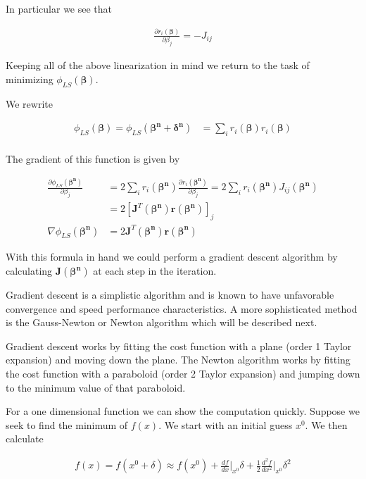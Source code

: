 \documentclass[12pt]{article}
\newcommand{\bv}[1]{\boldsymbol{#1}}
\begin{document}
In particular we see that

\begin{align}
\frac{\partial r_i(\bv{\beta})}{\partial \beta_j} = -J_{ij}
\end{align}

Keeping all of the above linearization in mind we return to the task of minimizing $\phi_{LS}(\bv{\beta})$.

We rewrite

\begin{align}
\phi_{LS}(\bv{\beta}) = \phi_{LS}(\bv{\beta^n + \delta^n}) &= \sum_i r_i(\bv{\beta})r_i(\bv{\beta})\\
\end{align}

The gradient of this function is given by

\begin{align}
\frac{\partial \phi_{LS}(\bv{\beta^n})}{\partial \beta_j} &= 2\sum_i r_i(\bv{\beta^n}) \frac{\partial r_i(\bv{\beta^n})}{\partial \beta_j} = 2\sum_i r_i(\bv{\beta^n}) J_{ij}(\bv{\beta^n})\\
&= 2\left[\bv{J}^T(\bv{\beta^n}) \bv{r}(\bv{\beta^n})\right]_j\\
\nabla \phi_{LS}(\bv{\beta^n}) &= 2\bv{J}^T(\bv{\beta^n})\bv{r}(\bv{\beta^n})
\end{align}

With this formula in hand we could perform a gradient descent algorithm by calculating $\bv{J}(\bv{\beta^n})$ at each step in the iteration.

Gradient descent is a simplistic algorithm and is known to have unfavorable convergence and speed performance characteristics. 
A more sophisticated method is the Gauss-Newton or Newton algorithm which will be described next.

Gradient descent works by fitting the cost function with a plane (order 1 Taylor expansion) and moving down the plane.
The Newton algorithm works by fitting the cost function with a paraboloid (order 2 Taylor expansion) and jumping down to the minimum value of that paraboloid. 

For a one dimensional function we can show the computation quickly.
Suppose we seek to find the minimum of $f(x)$.
We start with an initial guess $x^0$.
We then calculate

\begin{align}
f(x) = f(x^0 + \delta) \approx f(x^0) + \frac{df}{dx}\Big\rvert_{x^0} \delta + \frac{1}{2}\frac{d^2f}{dx^2}\Big\rvert_{x^0} \delta^2
\end{align}
\end{document}

